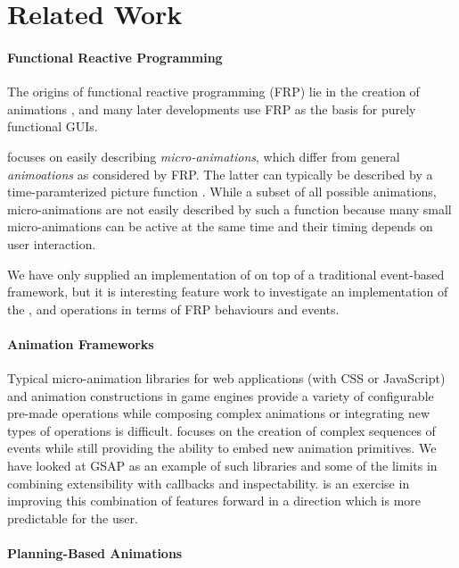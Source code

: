 \section{Related Work}
\label{sec:related}

\paragraph{Functional Reactive Programming}
The origins of functional reactive programming (FRP) lie in the creation of
animations \cite{DBLP:conf/icfp/ElliottH97}, and many later developments use
FRP as the basis for purely functional GUIs. 

\dsl{} focuses on easily describing \emph{micro-animations}, which differ from general
\emph{animoations} as considered by FRP. The latter can typically be described
by a time-paramterized picture function . While a subset of
all possible animations, micro-animations are not easily described by such a
function because many small micro-animations can be active at the same time and
their timing depends on user interaction.

We have only supplied an implementation of \dsl{} on top of a traditional
event-based framework, but it is interesting feature work to investigate an
implementation of the ,  and 
operations in terms of FRP behaviours and events.

\paragraph{Animation Frameworks}

Typical micro-animation libraries for web applications (with CSS or JavaScript)
and animation constructions in game engines provide a variety of configurable
pre-made operations while composing complex animations or integrating new types
of operations is difficult. \dsl{} focuses on the creation of complex sequences
of events while still providing the ability to embed new animation primitives.
We have looked at GSAP as an example of such libraries and some of the limits
in combining extensibility with callbacks and inspectability. \dsl{} is an
exercise in improving this combination of features forward in a direction which
is more predictable for the user.

\paragraph{Planning-Based Animations}

